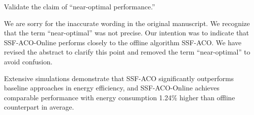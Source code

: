 \begin{metacomment}
	Validate the claim of ``near-optimal performance.''
\end{metacomment}
\begin{metaresponse}
	We are sorry for the inaccurate wording in the original manuscript.
	We recognize that the term ``near-optimal'' was not precise. Our intention was to indicate that SSF-ACO-Online performs closely to the offline algorithm SSF-ACO. We have revised the abstract to clarify this point and removed the term ``near-optimal'' to avoid confusion.
	\begin{changes}
		Extensive simulations demonstrate that SSF-ACO significantly outperforms baseline approaches in energy efficiency, and SSF-ACO-Online achieves comparable performance with energy consumption 1.24\% higher than offline counterpart in average.
	\end{changes}
\end{metaresponse}

